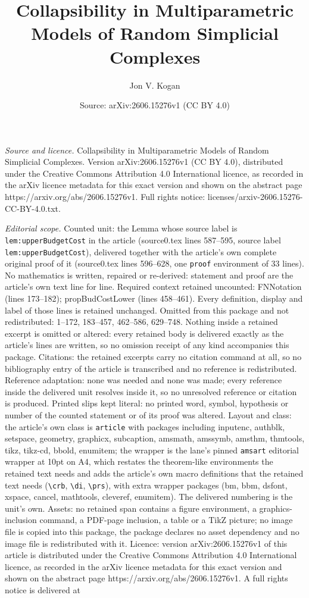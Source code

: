 \documentclass[10pt,a4paper]{amsart}
\title[Collapsibility in Multiparametric Models of Random Simplicia]{Collapsibility in Multiparametric Models of Random Simplicial Complexes}
\author{Jon V. Kogan}
\date{Source: arXiv:2606.15276v1 (CC BY 4.0)}
\begin{document}
\maketitle

\noindent\emph{Source and licence.} Collapsibility in Multiparametric Models of Random Simplicial Complexes. Version arXiv:2606.15276v1 (CC BY 4.0), distributed under the Creative Commons Attribution 4.0 International licence, as recorded in the arXiv licence metadata for this exact version and shown on the abstract page https://arxiv.org/abs/2606.15276v1. Full rights notice: licenses/arxiv-2606.15276-CC-BY-4.0.txt.\par\smallskip

\noindent\textit{Editorial scope.} Counted unit: the Lemma whose source label is \texttt{lem:upperBudgetCost} in the article (source0.tex lines 587--595, source label \texttt{lem:upperBudgetCost}), delivered together with the article's own complete original proof of it (source0.tex lines 596--628, one \texttt{proof} environment of 33 lines). No mathematics is written, repaired or re-derived: statement and proof are the article's own text line for line. Required context retained uncounted: FNNotation (lines 173--182); propBudCostLower (lines 458--461). Every definition, display and label of those lines is retained unchanged. Omitted from this package and not redistributed: 1--172, 183--457, 462--586, 629--748. Nothing inside a retained excerpt is omitted or altered: every retained body is delivered exactly as the article's lines are written, so no omission receipt of any kind accompanies this package. Citations: the retained excerpts carry no citation command at all, so no bibliography entry of the article is transcribed and no reference is redistributed. Reference adaptation: none was needed and none was made; every reference inside the delivered unit resolves inside it, so no unresolved reference or citation is produced. Printed slips kept literal: no printed word, symbol, hypothesis or number of the counted statement or of its proof was altered. Layout and class: the article's own class is \texttt{article} with packages including inputenc, authblk, setspace, geometry, graphicx, subcaption, amsmath, amssymb, amsthm, thmtools, tikz, tikz-cd, bbold, enumitem; the wrapper is the lane's pinned \texttt{amsart} editorial wrapper at 10pt on A4, which restates the theorem-like environments the retained text needs and adds the article's own macro definitions that the retained text needs (\texttt{\textbackslash crb}, \texttt{\textbackslash di}, \texttt{\textbackslash prs}), with extra wrapper packages (bm, bbm, dsfont, xspace, cancel, mathtools, cleveref, enumitem). The delivered numbering is the unit's own. Assets: no retained span contains a figure environment, a graphics-inclusion command, a PDF-page inclusion, a table or a TikZ picture; no image file is copied into this package, the package declares no asset dependency and no image file is redistributed with it. Licence: version arXiv:2606.15276v1 of this article is distributed under the Creative Commons Attribution 4.0 International licence, as recorded in the arXiv licence metadata for this exact version and shown on the abstract page https://arxiv.org/abs/2606.15276v1. A full rights notice is delivered at 
\end{document}
